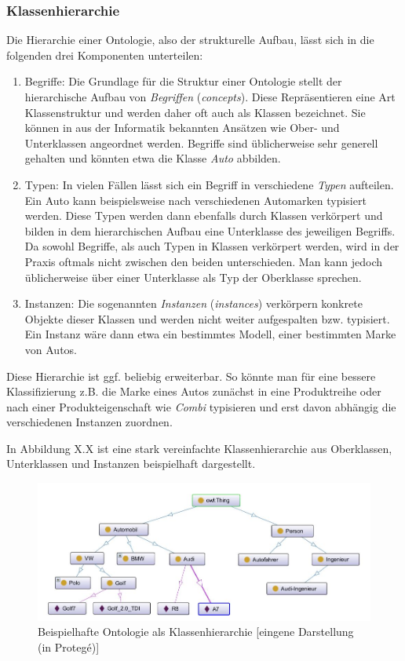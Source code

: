 \documentclass[12pt]{report}
\begin{document}
\subsubsection{Klassenhierarchie}
Die Hierarchie einer Ontologie, also der strukturelle Aufbau, lässt sich in die folgenden drei Komponenten unterteilen:
\begin{enumerate}
\item Begriffe: Die Grundlage für die Struktur einer Ontologie stellt der hierarchische Aufbau von \textit{Begriffen} (\textit{concepts}). Diese Repräsentieren eine Art Klassenstruktur und werden daher oft auch als Klassen bezeichnet. Sie können in aus der Informatik bekannten Ansätzen wie Ober- und Unterklassen angeordnet werden. Begriffe sind üblicherweise sehr generell gehalten und könnten etwa die Klasse \textit{Auto} abbilden. 

\item Typen: In vielen Fällen lässt sich ein Begriff in verschiedene \textit{Typen} aufteilen. Ein Auto kann beispielsweise nach verschiedenen Automarken typisiert werden. Diese Typen werden dann ebenfalls durch Klassen verkörpert und bilden in dem hierarchischen Aufbau eine Unterklasse des jeweiligen Begriffs. Da sowohl Begriffe, als auch Typen in Klassen verkörpert werden, wird in der Praxis oftmals nicht zwischen den beiden unterschieden. Man kann jedoch üblicherweise über einer Unterklasse als Typ der Oberklasse sprechen. 

\item Instanzen: Die sogenannten \textit{Instanzen} (\textit{instances}) verkörpern konkrete Objekte dieser Klassen und werden nicht weiter aufgespalten bzw. typisiert. Ein Instanz wäre dann etwa ein bestimmtes Modell, einer bestimmten Marke von Autos. 
\end{enumerate}

Diese Hierarchie ist ggf. beliebig erweiterbar. So könnte man für eine bessere Klassifizierung z.B. die Marke eines Autos zunächst in eine Produktreihe oder nach einer Produkteigenschaft wie \textit{Combi} typisieren und erst davon abhängig die verschiedenen Instanzen zuordnen.

In Abbildung X.X ist eine stark vereinfachte Klassenhierarchie aus Oberklassen, Unterklassen und Instanzen beispielhaft dargestellt.

 
\begin{figure}[H]
\begin{center}
\includegraphics[scale=0.8]{Bilder/ontologyClasses.jpg}
\caption{Beispielhafte Ontologie als Klassenhierarchie [eingene Darstellung (in Protegé)]}
\end{center}
\end{figure}
\end{document}
